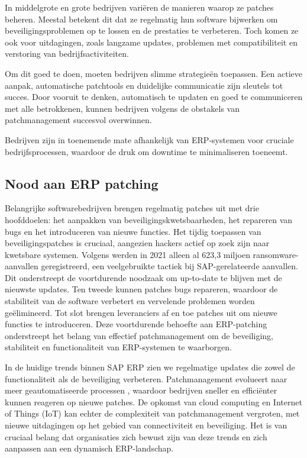 In middelgrote en grote bedrijven variëren de manieren waarop ze patches beheren. Meestal betekent dit dat ze regelmatig hun software bijwerken om beveiligingsproblemen op te lossen en de prestaties te verbeteren. Toch komen ze ook voor uitdagingen, zoals langzame updates, problemen met compatibiliteit en verstoring van bedrijfsactiviteiten.

Om dit goed te doen, moeten bedrijven slimme strategieën toepassen. Een actieve aanpak, automatische patchtools en duidelijke communicatie zijn sleutels tot succes. Door vooruit te denken, automatisch te updaten en goed te communiceren met alle betrokkenen, kunnen bedrijven volgens \autocite{Firch2023} de obstakels van patchmanagement succesvol overwinnen. 

Bedrijven zijn in toenemende mate afhankelijk van ERP-systemen voor cruciale bedrijfsprocessen, waardoor de druk om downtime te minimaliseren toeneemt.
\subsection{Nood aan ERP patching }
Belangrijke softwarebedrijven brengen regelmatig patches uit met drie hoofddoelen: het aanpakken van beveiligingskwetsbaarheden, het repareren van bugs en het introduceren van nieuwe functies. Het tijdig toepassen van beveiligingspatches is cruciaal, aangezien hackers actief op zoek zijn naar kwetsbare systemen. Volgens \autocite{Griffiths2022} werden in 2021 alleen al 623,3 miljoen ransomware-aanvallen geregistreerd, een veelgebruikte tactiek bij SAP-gerelateerde aanvallen. Dit onderstreept de voortdurende noodzaak om up-to-date te blijven met de nieuwste updates. Ten tweede kunnen patches bugs repareren, waardoor de stabiliteit van de software verbetert en vervelende problemen worden geëlimineerd. Tot slot brengen leveranciers af en toe patches uit om nieuwe functies te introduceren. Deze voortdurende behoefte aan ERP-patching onderstreept het belang van effectief patchmanagement om de beveiliging, stabiliteit en functionaliteit van ERP-systemen te waarborgen.

In de huidige trends binnen SAP ERP zien we regelmatige updates die zowel de functionaliteit als de beveiliging verbeteren. Patchmanagement evolueert naar meer geautomatiseerde processen \autocite{Mukkamala2022}, waardoor bedrijven sneller en efficiënter kunnen reageren op nieuwe patches. De opkomst van cloud computing en Internet of Things (IoT) kan echter de complexiteit van patchmanagement vergroten, met nieuwe uitdagingen op het gebied van connectiviteit en beveiliging. Het is van cruciaal belang dat organisaties zich bewust zijn van deze trends en zich aanpassen aan een dynamisch ERP-landschap. 

